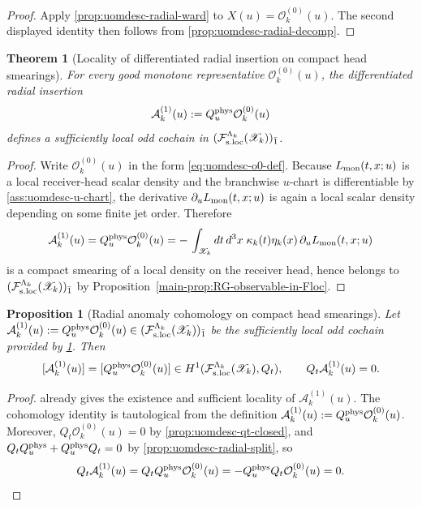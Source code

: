 \documentclass[11pt]{article}
\theoremstyle{definition}
\theoremstyle{plain}
\newtheorem{theorem}[definition]{Theorem}
\newtheorem{proposition}[definition]{Proposition}
\theoremstyle{remark}
\newcommand{\Fsloc}{\mathcal F_{\rm s.loc}}
\newcommand{\Xscr}{\mathscr X}
\newcommand{\Ozero}{\mathcal O^{(0)}}
\newcommand{\Aone}{\mathcal A^{(1)}}
\newcommand{\Qt}{Q_t}
\newcommand{\Quphys}{Q_u^{\rm phys}}
\begin{document}
\begin{proof}
Apply \cref{prop:uomdesc-radial-ward} to \(X(u)=\Ozero_k(u)\).
The second displayed identity then follows from \cref{prop:uomdesc-radial-decomp}.
\end{proof}

\begin{theorem}[Locality of differentiated radial insertion on compact head smearings]
\label{thm:uomdesc-a1-locality}
For every good monotone representative \(\Ozero_k(u)\), the differentiated radial insertion
\[
\Aone_k(u):=\Quphys\Ozero_k(u)
\]
defines a sufficiently local odd cochain in \((\Fsloc^{\Lambda_k}(\Xscr_k))_{\bar 1}\).
\end{theorem}

\begin{proof}
Write \(\Ozero_k(u)\) in the form \eqref{eq:uomdesc-o0-def}.
Because \(L_{\rm mon}(t,x;u)\) is a local receiver-head scalar density and the branchwise \(u\)-chart
is differentiable by \cref{ass:uomdesc-u-chart}, the derivative \(\partial_u L_{\rm mon}(t,x;u)\)
is again a local scalar density depending on some finite jet order.
Therefore
\[
\Aone_k(u)
=
\Quphys\Ozero_k(u)
=
-\,
\int_{\Xscr_k}dt\,d^3x\;
\kappa_k(t)\eta_k(x)\,\partial_u L_{\rm mon}(t,x;u)
\]
is a compact smearing of a local density on the receiver head, hence belongs to
\((\Fsloc^{\Lambda_k}(\Xscr_k))_{\bar 1}\) by
Proposition~\ref{main-prop:RG-observable-in-Floc}.
\end{proof}

\begin{proposition}[Radial anomaly cohomology on compact head smearings]
\label{prop:uomdesc-a1-from-sk}
Let \(\Aone_k(u):=\Quphys\Ozero_k(u)\in (\Fsloc^{\Lambda_k}(\Xscr_k))_{\bar 1}\) be the sufficiently
local odd cochain provided by \cref{thm:uomdesc-a1-locality}.
Then
\[
[\Aone_k(u)]=[\Quphys \Ozero_k(u)]
\in
H^1(\Fsloc^{\Lambda_k}(\Xscr_k),\Qt),
\qquad
\Qt \Aone_k(u)=0.
\]
\end{proposition}

\begin{proof}
 already gives the existence and sufficient locality of
\(\Aone_k(u)\).
The cohomology identity is tautological from the definition \(\Aone_k(u):=\Quphys\Ozero_k(u)\).
Moreover, \(\Qt\Ozero_k(u)=0\) by \cref{prop:uomdesc-qt-closed}, and
\(\Qt\Quphys+\Quphys\Qt=0\) by \cref{prop:uomdesc-radial-split}, so
\[
\Qt\Aone_k(u)=\Qt\Quphys\Ozero_k(u)=-\Quphys\Qt\Ozero_k(u)=0.
\]
\end{proof}
\end{document}

